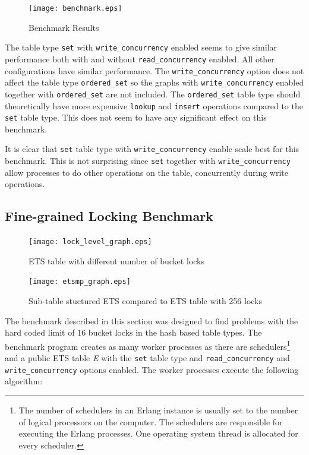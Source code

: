 \documentclass[aps,pre,preprint,nofootinbib]{revtex4}
\begin{document}
\begin{figure}[htb]
\centering
\texttt{[image: benchmark.eps]}
\caption{Benchmark Results}
\label{fig:benchmark_results}
\end{figure}

The table type \verb|set| with \verb|write_concurrency| enabled seems to give similar performance both with and without \verb|read_concurrency| enabled.
All other configurations have similar performance.
The \verb|write_concurrency| option does not affect the table type \verb|ordered_set| so the graphs with  \verb|write_concurrency| enabled together with \verb|ordered_set| are not included.
The \verb|ordered_set| table type should theoretically have more expensive \verb|lookup| and \verb|insert| operations compared to the \verb|set| table type.
This does not seem to have any significant effect on this benchmark.

It is clear that \verb|set| table type with \verb|write_concurrency| enable scale best for this benchmark.
This is not surprising since \verb|set| together with \verb|write_concurrency| allow processes to do other operations on the table, concurrently during write operations. 

\subsection{Fine-grained Locking Benchmark}\label{sec:finegrained_bench}

\begin{figure}[htb]
\centering
\texttt{[image: lock\_level\_graph.eps]}
\caption{ETS table with different number of bucket locks}
\label{fig:lock_level}
\end{figure} 

\begin{figure}[htb]
\centering
\texttt{[image: etsmp\_graph.eps]}
\caption{Sub-table stuctured ETS compared to ETS table with 256 locks}
\label{fig:etsmp}
\end{figure}

The benchmark described in this section was designed to find problems with the hard coded limit of 16 bucket locks in the hash based table types.
The benchmark program creates as many worker processes as there are schedulers\footnote{The number of schedulers in an Erlang instance is usually set to the number of logical processors on the computer.
The schedulers are responsible for executing the Erlang processes. 
One operating system thread is allocated for every scheduler.} and a public ETS table \emph{E} with the \verb|set| table type and \verb|read_concurrency| and \verb|write_concurrency| options enabled.
The worker processes execute the following algorithm:
\end{document}
